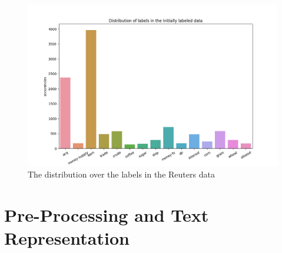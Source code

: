 \begin{figure}
    \includegraphics[width=\textwidth]{figures/class-distribution-reuters.png}
    \caption{The distribution over the labels in the Reuters data}
    \label{fig:class-distribution-reuters}
\end{figure}

\section{Pre-Processing and Text Representation}\label{sec:pre-processing}

